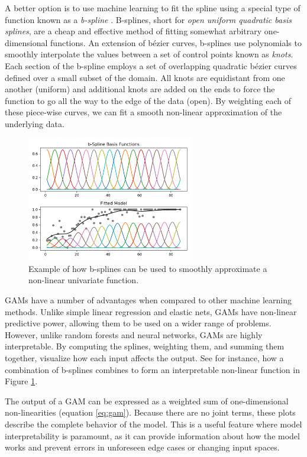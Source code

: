 A better option is to use machine learning to fit the spline using a special type of function known as a \textit{b-spline} \citep{deBoor2006ASplines}. B-splines, short for \textit{open uniform quadratic basis splines}, are a cheap and effective method of fitting somewhat arbitrary one-dimensional functions. An extension of bézier curves, b-splines use polynomials to smoothly interpolate the values between a set of control points known as \textit{knots}. Each section of the b-spline employs a set of overlapping quadratic bézier curves defined over a small subset of the domain. All knots are equidistant from one another (uniform) and additional knots are added on the ends to force the function to go all the way to the edge of the data (open). By weighting each of these piece-wise curves, we can fit a smooth non-linear approximation of the underlying data.

\begin{figure}[t]
    \centering
    \includegraphics[width=0.65\textwidth]{fig/pygam_basis}
    \caption{Example of how b-splines can be used to smoothly approximate a non-linear univariate function. \citep{Serven2018PyGAM:Python}}
    \label{fig:b-spline}
\end{figure}

GAMs have a number of advantages when compared to other machine learning methods. Unlike simple linear regression and elastic nets, GAMs have non-linear predictive power, allowing them to be used on a wider range of problems. However, unlike random forests and neural networks, GAMs are highly interpretable. By computing the splines, weighting them, and summing them together,  visualize how each input affects the output. See for instance, how a combination of b-splines combines to form an interpretable non-linear function in Figure \ref{fig:b-spline}.

The output of a GAM can be expressed as a weighted sum of one-dimensional non-linearities (equation \ref{eq:gam}). Because there are no joint terms, these plots describe the complete behavior of the model. This is a useful feature where model interpretability is paramount, as it can provide information about how the model works and prevent errors in unforeseen edge cases or changing input spaces.

